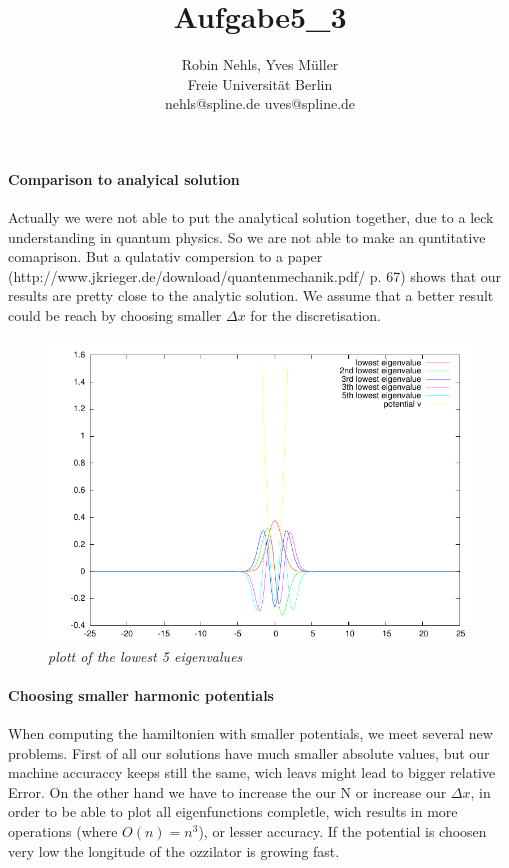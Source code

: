 \documentclass[11pt,a4paper,notitlepage,onecolumn]{article}
\title{Aufgabe5\_3}
\author{Robin Nehls, Yves Müller\\
  Freie Universit\"at Berlin\\
  nehls@spline.de uves@spline.de }
\date{}
\begin{document}
\maketitle

\paragraph{Comparison to analyical solution}
Actually we were not able to put the analytical solution together, due to a
leck understanding in quantum physics. So we are not able to make an 
quntitative comaprison. But a qulatativ compersion to a paper 
(http://www.jkrieger.de/download/quantenmechanik.pdf/ p. 67) shows that our
results are pretty close to the analytic solution. We assume that a better 
result could be reach by choosing smaller $\Delta x$ for the discretisation.


\paragraph{}


\begin{figure}
\centering
\includegraphics[width=\textwidth]{aufgabe3-normal.pdf}
\caption{\em \small plott of the lowest 5 eigenvalues}
\end{figure}

\paragraph{Choosing smaller harmonic potentials}
When computing the hamiltonien with smaller potentials, we meet several new 
problems. First of all our solutions have much smaller absolute values, but
our machine accuraccy keeps still the same, wich leavs might lead to bigger
relative Error. On the other hand we have to increase the our N or increase 
our $\Delta x$, in order to be able to plot all eigenfunctions completle,
wich results in more operations (where $O(n)=n^3$), or lesser accuracy. If 
the potential is choosen very low the longitude of the ozzilator is growing
fast.
\end{document}
